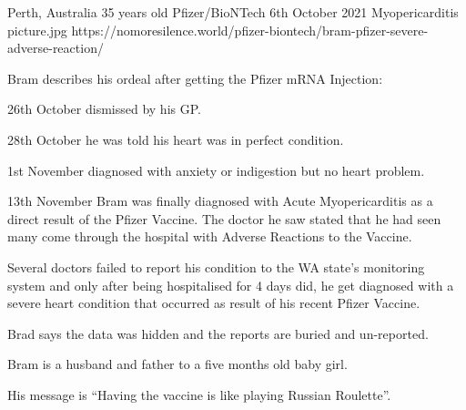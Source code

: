 {Perth, Australia}
{35 years old}
{Pfizer/BioNTech}
{6th October 2021}
{Myopericarditis}
{picture.jpg}
{https://nomoresilence.world/pfizer-biontech/bram-pfizer-severe-adverse-reaction/}
{


Bram describes his ordeal after getting the Pfizer mRNA Injection:

26th October dismissed by his GP.

28th October he was told his heart was in perfect condition.

1st November diagnosed with anxiety or indigestion but no heart problem.

13th November Bram was finally diagnosed with Acute Myopericarditis as a direct result of the Pfizer Vaccine. The doctor he saw stated that he had seen many come through the hospital with Adverse Reactions to the Vaccine.

Several doctors failed to report his condition to the WA state’s monitoring system and only after being hospitalised for 4 days did, he get diagnosed with a severe heart condition that occurred as result of his recent Pfizer Vaccine.

Brad says the data was hidden and the reports are buried and un-reported.

Bram is a husband and father to a five months old baby girl.

His message is “Having the vaccine is like playing Russian Roulette”.
}
